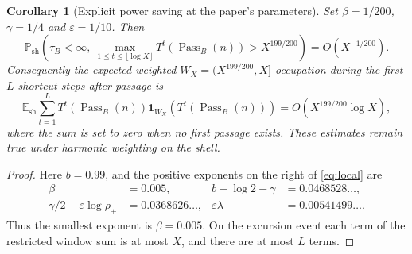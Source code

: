\documentclass[11pt]{amsart}
\newtheorem{corollary}{Corollary}
\theoremstyle{remark}\newtheorem{remark}{Remark}
\newcommand{\Pass}{\operatorname{Pass}}
\newcommand{\Psh}{\mathbb P_{\mathrm{sh}}}
\begin{document}
\begin{corollary}[Explicit power saving at the paper's parameters]\label{cor:concrete}
Set $\beta=1/200$, $\gamma=1/4$ and $\varepsilon=1/10$. Then
\[
 \boxed{\Psh\!\left(\tau_B<\infty,\ \max_{1\le t\le\lfloor\log X\rfloor}
 T^t(\Pass_B(n))>X^{199/200}\right)=O(X^{-1/200}).}
\]
Consequently the expected weighted $W_X=(X^{199/200},X]$ occupation during the first $L$ shortcut steps after passage is
\[
 \boxed{\mathbb E_{\mathrm{sh}}\sum_{t=1}^L T^t(\Pass_B(n))\mathbf1_{W_X}(T^t(\Pass_B(n)))
 =O\!\left(X^{199/200}\log X\right),}
\]
where the sum is set to zero when no first passage exists.  These estimates remain true under harmonic weighting on the shell.
\end{corollary}
\begin{proof}
Here $b=0.99$, and the positive exponents on the right of \eqref{eq:local} are
\[
\begin{aligned}
  \beta &=0.005, & b-\log2-\gamma&=0.0468528\ldots,\\
  \gamma/2-\varepsilon\log\rho_+&=0.0368626\ldots,
  &\varepsilon\lambda_-&=0.00541499\ldots.
\end{aligned}
\]
Thus the smallest exponent is $\beta=0.005$.  On the excursion event each term of the restricted window sum is at most $X$, and there are at most $L$ terms.
\end{proof}
\end{document}
